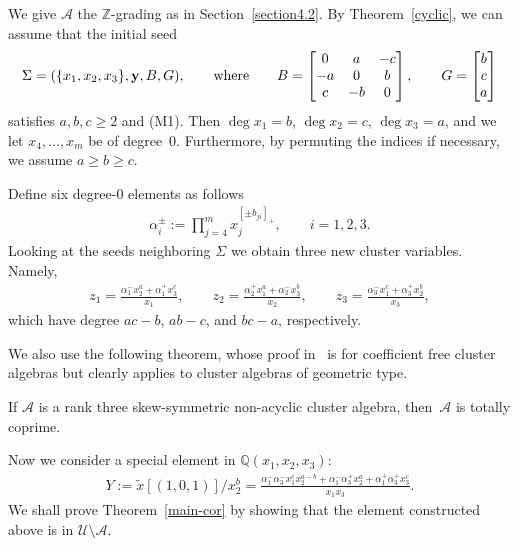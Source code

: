 We give $\mathcal{A}$ the $\mathbb{Z}$-grading as in Section~\ref{section4.2}. By Theorem~\ref{cyclic}, we can assume that the initial seed
\begin{gather*}
\Sigma=(\{x_1,x_2,x_3\},{\bf y},B,G),\qquad\textrm{where} \qquad B= \left[ \begin{matrix}
0 & a &-c \\
-a & 0 & b \\
c& -b & 0
\end{matrix}  \right], \qquad G=\left[ \begin{matrix}
b \\ c \\ a  \end{matrix} \right]
\end{gather*}
satisf\/ies $a,b,c\ge2$ and (M1). Then $\deg x_{1}=b$, $\deg x_{2}=c$, $\deg x_{3}=a$, and we let $x_{4},\dots,x_{m}$ be of degree~0.  Furthermore, by permuting the indices if necessary, we assume
$a\ge b\ge c$.


Def\/ine six degree-0 elements as follows
\begin{gather*}
\alpha_i^\pm := \prod_{j=4}^m x_j^{[\pm b_{ji}]_+}, \qquad i=1,2,3.
\end{gather*}
Looking at the seeds neighboring $\Sigma$ we obtain three new cluster variables. Namely,
\begin{gather*}
z_1=\frac{\alpha_1^-x_2^a+\alpha_1^+x_3^c}{x_1},
\qquad z_2=\frac{\alpha_2^+x_1^a+\alpha_2^-x_3^b}{x_2}, \qquad z_3=\frac{\alpha_3^-x_1^c+\alpha_3^+x_2^b}{x_3},
 \end{gather*} which have degree $ac-b$, $ab-c$, and $bc-a$, respectively.

We also use the following theorem, whose proof in~\cite{MM} is for coef\/f\/icient free cluster algebras but clearly applies to cluster algebras of geometric type.
\begin{Theorem}
\label{coprime}
If $\mathcal{A}$ is a rank three skew-symmetric non-acyclic cluster algebra, then~$\mathcal{A}$ is totally coprime.
\end{Theorem}

Now we consider a special element in $\mathbb{Q}(x_1,x_2,x_3)$:
\begin{gather*}
Y:=\tilde{x}[(1,0,1)]/x_2^b =\frac{\alpha_1^-\alpha_3^-x_1^cx_2^{a-b}+\alpha_1^-\alpha_3^+x_2^a+\alpha_1^+\alpha_3^+x_3^c}{x_1x_3}.
\end{gather*}
We shall prove Theorem~\ref{main-cor} by showing that the element constructed above is in $\mathcal{U}\setminus\mathcal{A}$.


